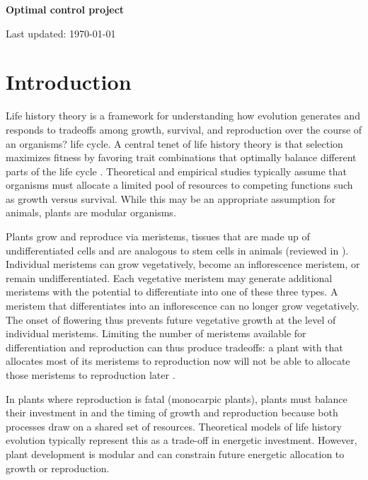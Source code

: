 \documentclass[12pt, oneside]{article}   	%
\begin{document}
 

\begin{titlepage}
   \begin{center}
       \vspace*{1cm}
 
       \textbf{Optimal control project}
 
       \vspace{1.5cm}
 
 
   	Last updated: \today
 
   \end{center}
\end{titlepage}
%

\section{Introduction}

Life history theory is a framework for understanding how evolution generates and responds to tradeoffs among growth, survival, and reproduction over the course of an organisms? life cycle. A central tenet of life history theory is that selection maximizes fitness by favoring trait combinations that optimally balance different parts of the life cycle \cite{Cole1954,Lande1983}. Theoretical and empirical studies typically assume that organisms must allocate a limited pool of resources to competing functions such as growth versus survival. While this may be an appropriate assumption for animals, plants are modular organisms.

Plants grow and reproduce via meristems, tissues that are made up of undifferentiated cells and are analogous to stem cells in animals (reviewed in \cite{Ward2004,Wang2018}). Individual meristems can grow vegetatively, become an inflorescence meristem, or remain undifferentiated. Each vegetative meristem may generate additional meristems with the potential to differentiate into one of these three types. A meristem that differentiates into an inflorescence can no longer grow vegetatively. The onset of flowering thus prevents future vegetative growth at the level of individual meristems. Limiting the number of meristems available for differentiation and reproduction can thus produce tradeoffs: a plant with that allocates most of its meristems to reproduction now will not be able to allocate those meristems to reproduction later \cite{Watson1984a,Geber1990}.

In plants where reproduction is fatal (monocarpic plants), plants must balance their investment in and the timing of growth and reproduction because both processes draw on a shared set of resources. Theoretical models of life history evolution typically represent this as a trade-off in energetic investment. However, plant development is modular and can constrain future energetic allocation to growth or reproduction.
\end{document}
